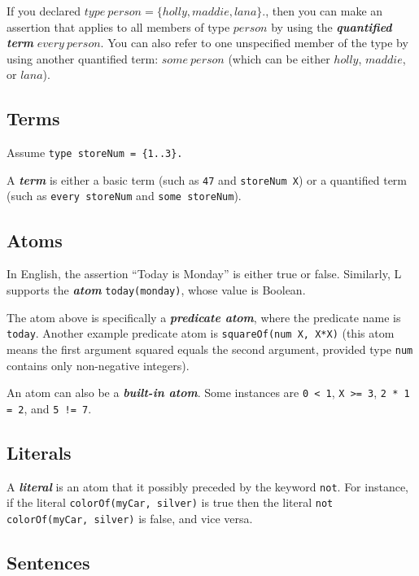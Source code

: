 \documentclass[letterpaper,10pt]{article}
\begin{document}
\begin{flushleft}
If you declared $type~person=\{holly, maddie, lana\}.$, then you can make an assertion that applies to all members of type $person$ by using the \textbf{\textit{quantified term}} $every~person$. You can also refer to one unspecified member of the type by using another quantified term: $some~person$ (which can be either $holly$, $maddie$, or $lana$).

\subsection{Terms}

Assume \texttt{type storeNum = \{1..3\}.}

A \textit{\textbf{term}} is either a basic term (such as \texttt{47} and \texttt{storeNum X}) or a quantified term (such as \texttt{every storeNum} and \texttt{some storeNum}).

\subsection{Atoms}

In English, the assertion ``Today is Monday'' is either true or false. Similarly, L supports the \textbf{\textit{atom}} \texttt{today(monday)}, whose value is Boolean. 

The atom above is specifically a \textbf{\textit{predicate atom}}, where the predicate name is \texttt{today}. Another example predicate atom is \texttt{squareOf(num X, X*X)} (this atom means the first argument squared equals the second argument, provided type \texttt{num} contains only non-negative integers).

An atom can also be a \textbf{\textit{built-in atom}}. Some instances are \texttt{0 < 1}, \texttt{X >= 3}, \texttt{2 * 1 = 2}, and  \texttt{5 != 7}.

\subsection{Literals}

A \textbf{\textit{literal}} is an atom that it possibly preceded by the keyword \texttt{not}. For instance, if the literal \texttt{colorOf(myCar, silver)} is true then the literal \texttt{not colorOf(myCar, silver)} is false, and vice versa.



\subsection{Sentences}\label{sentsec}


\end{flushleft}
\end{document}
